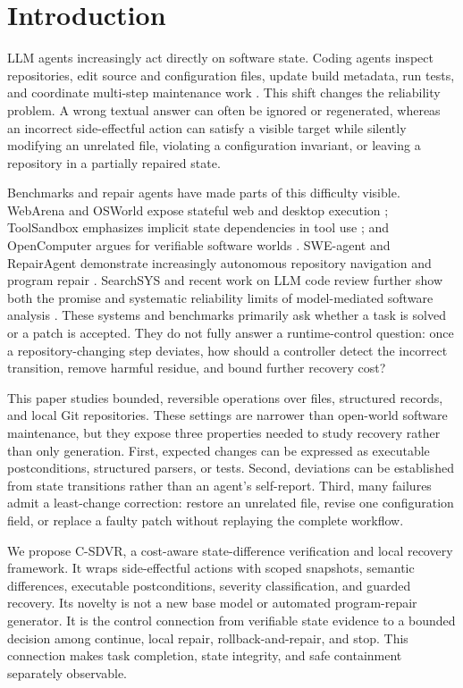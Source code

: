 \documentclass[pdflatex,sn-apa]{sn-jnl}
\begin{document}
\section{Introduction}

LLM agents increasingly act directly on software state. Coding agents inspect repositories, edit source and configuration files, update build metadata, run tests, and coordinate multi-step maintenance work \cite{yang2024sweagent,bouzenia2025repairagent}. This shift changes the reliability problem. A wrong textual answer can often be ignored or regenerated, whereas an incorrect side-effectful action can satisfy a visible target while silently modifying an unrelated file, violating a configuration invariant, or leaving a repository in a partially repaired state.

Benchmarks and repair agents have made parts of this difficulty visible. WebArena and OSWorld expose stateful web and desktop execution \cite{zhou2023webarena,xie2024osworld}; ToolSandbox emphasizes implicit state dependencies in tool use \cite{lu2024toolsandbox}; and OpenComputer argues for verifiable software worlds \cite{wei2026opencomputer}. SWE-agent and RepairAgent demonstrate increasingly autonomous repository navigation and program repair \cite{yang2024sweagent,bouzenia2025repairagent}. SearchSYS and recent work on LLM code review further show both the promise and systematic reliability limits of model-mediated software analysis \cite{dakhama2025searchsys,jin2026codereview}. These systems and benchmarks primarily ask whether a task is solved or a patch is accepted. They do not fully answer a runtime-control question: once a repository-changing step deviates, how should a controller detect the incorrect transition, remove harmful residue, and bound further recovery cost?

This paper studies bounded, reversible operations over files, structured records, and local Git repositories. These settings are narrower than open-world software maintenance, but they expose three properties needed to study recovery rather than only generation. First, expected changes can be expressed as executable postconditions, structured parsers, or tests. Second, deviations can be established from state transitions rather than an agent's self-report. Third, many failures admit a least-change correction: restore an unrelated file, revise one configuration field, or replace a faulty patch without replaying the complete workflow.

We propose C-SDVR, a cost-aware state-difference verification and local recovery framework. It wraps side-effectful actions with scoped snapshots, semantic differences, executable postconditions, severity classification, and guarded recovery. Its novelty is not a new base model or automated program-repair generator. It is the control connection from verifiable state evidence to a bounded decision among continue, local repair, rollback-and-repair, and stop. This connection makes task completion, state integrity, and safe containment separately observable.
\end{document}
